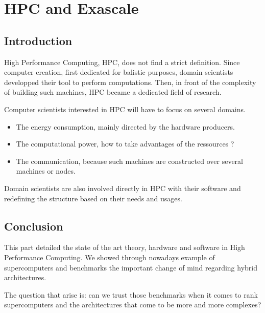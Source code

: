 \part{HPC and Exascale}
\chapter*{Introduction}

High Performance Computing, HPC, does not find a strict definition. 
Since computer creation, first dedicated for balistic purposes, domain scientists developped their tool to perform computations. 
Then, in front of the complexity of building such machines, HPC became a dedicated field of research. 

Computer scientists interested in HPC will have to focus on several domains. 
\begin{itemize}
\item The energy consumption, mainly directed by the hardware producers. 
\item The computational power, how to take advantages of the ressources ? 
\item The communication, because such machines are constructed over several machines or nodes. 
\end{itemize}

Domain scientists are also involved directly in HPC with their software and redefining the structure based on their needs and usages. 











\chapter*{Conclusion}
This part detailed the state of the art theory, hardware and software in High Performance Computing. 
We showed through nowadays example of supercomputers and benchmarks the important change of mind regarding hybrid architectures. 

The question that arise is: can we trust those benchmarks when it comes to rank supercomputers and the architectures that come to be more and more complexes?

